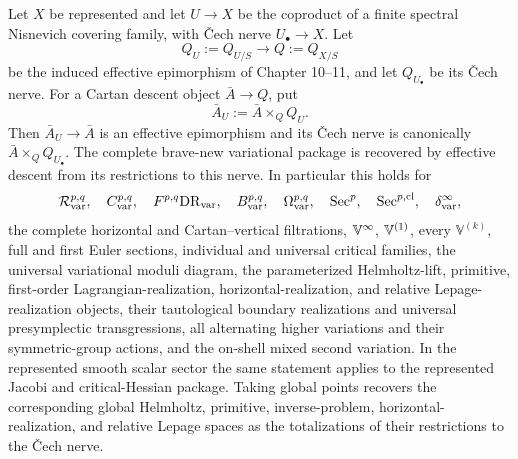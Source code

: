 \begin{theorem}
\label{thm:var-nisnevich-descent}
Let \(X\) be represented and let \(U\to X\) be the coproduct of a finite spectral Nisnevich covering family, with \v{C}ech nerve \(U_\bullet\to X\). Let
\[
    Q_U:=Q_{U/S}\longrightarrow Q:=Q_{X/S}
\]
be the induced effective epimorphism of Chapter 10--11, and let \(Q_{U_\bullet}\) be its \v{C}ech nerve. For a Cartan descent object \(\bar A\to Q\), put
\[
    \bar A_U:=\bar A\times_QQ_U.
\]
Then \(\bar A_U\to\bar A\) is an effective epimorphism and its \v{C}ech nerve is canonically \(\bar A\times_QQ_{U_\bullet}\). The complete brave-new variational package is recovered by effective descent from its restrictions to this nerve. In particular this holds for
\[
    \mathcal R_{\mathrm{var}}^{p,q},\quad
    C_{\mathrm{var}}^{p,q},\quad
    F^{p,q}\mathrm{DR}_{\mathrm{var}},\quad
    B_{\mathrm{var}}^{p,q},\quad
    \Omega_{\mathrm{var}}^{p,q},\quad
    \operatorname{Sec}^p,\quad
    \operatorname{Sec}^{p,\mathrm{cl}},\quad
    \delta^{\infty}_{\mathrm{var}},
\]
the complete horizontal and Cartan--vertical filtrations, \(\mathbb V^{\infty}\), \(\mathbb V^{(1)}\), every \(\mathbb V^{(k)}\), full and first Euler sections, individual and universal critical families, the universal variational moduli diagram, the parameterized Helmholtz-lift, primitive, first-order Lagrangian-realization, horizontal-realization, and relative Lepage-realization objects, their tautological boundary realizations and universal presymplectic transgressions, all alternating higher variations and their symmetric-group actions, and the on-shell mixed second variation.  In the represented smooth scalar sector the same statement applies to the represented Jacobi and critical-Hessian package. Taking global points recovers the corresponding global Helmholtz, primitive, inverse-problem, horizontal-realization, and relative Lepage spaces as the totalizations of their restrictions to the Čech nerve.
\end{theorem}

